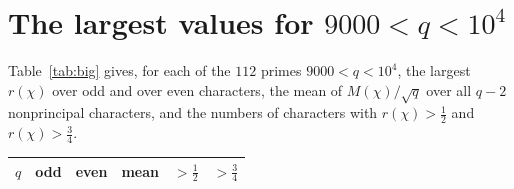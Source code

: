 \documentclass[11pt,a4paper,reqno]{amsart}
\theoremstyle{remark}
\numberwithin{equation}{section}
\begin{document}
\section{The largest values for \texorpdfstring{$9000<q<10^4$}{9000<q<10000}}\label{app:big}
Table~\ref{tab:big} gives, for each of the $112$ primes $9000<q<10^4$, the largest $r(\chi)$ over odd and over even characters, the mean of $M(\chi)/\sqrt q$ over all $q-2$ nonprincipal characters, and the numbers of characters with $r(\chi)>\tfrac12$ and $r(\chi)>\tfrac34$.

\begin{table}[p]
\centering\scriptsize
\setlength{\tabcolsep}{3pt}
\begin{tabular}{@{}rccccr@{}}
\toprule
$q$ & odd & even & mean & $>\tfrac12$ & $>\tfrac34$\\
\midrule


\end{tabular}
\end{table}
\end{document}
